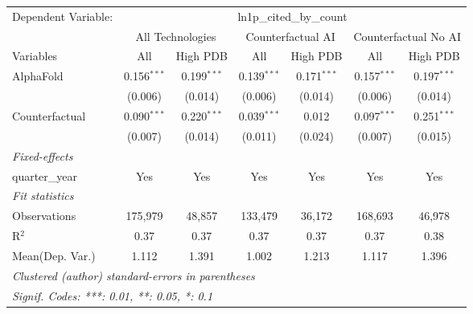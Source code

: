 \begingroup
\centering
\begin{tabular}{lcccccc}
   \tabularnewline \midrule \midrule
   Dependent Variable: & \multicolumn{6}{c}{ln1p\_cited\_by\_count}\\
 & \multicolumn{2}{c}{All Technologies} & \multicolumn{2}{c}{Counterfactual AI} & \multicolumn{2}{c}{Counterfactual No AI} \\
\cmidrule(lr){1-1}\cmidrule(lr){2-3} \cmidrule(lr){4-5} \cmidrule(lr){6-7}
Variables & \multicolumn{1}{c}{All} & \multicolumn{1}{c}{High PDB} & \multicolumn{1}{c}{All} & \multicolumn{1}{c}{High PDB} & \multicolumn{1}{c}{All} & \multicolumn{1}{c}{High PDB} \\
\cmidrule(lr){1-1}\cmidrule(lr){2-2} \cmidrule(lr){3-3} \cmidrule(lr){4-4} \cmidrule(lr){5-5} \cmidrule(lr){6-6} \cmidrule(lr){7-7}
   AlphaFold      & 0.156$^{***}$ & 0.199$^{***}$ & 0.139$^{***}$ & 0.171$^{***}$ & 0.157$^{***}$ & 0.197$^{***}$\\   
                  & (0.006)       & (0.014)       & (0.006)       & (0.014)       & (0.006)       & (0.014)\\   
   Counterfactual & 0.090$^{***}$ & 0.220$^{***}$ & 0.039$^{***}$ & 0.012         & 0.097$^{***}$ & 0.251$^{***}$\\   
                  & (0.007)       & (0.014)       & (0.011)       & (0.024)       & (0.007)       & (0.015)\\   
   \midrule
   \emph{Fixed-effects}\\
   quarter\_year  & Yes           & Yes           & Yes           & Yes           & Yes           & Yes\\  
   \midrule
   \emph{Fit statistics}\\
   Observations   & 175,979       & 48,857        & 133,479       & 36,172        & 168,693       & 46,978\\  
   R$^2$          & 0.37          & 0.37          & 0.37          & 0.37          & 0.37          & 0.38\\  
Mean(Dep. Var.) & 1.112 & 1.391 & 1.002 & 1.213 & 1.117 & 1.396 \\
   \midrule \midrule
   \multicolumn{7}{l}{\emph{Clustered (author) standard-errors in parentheses}}\\
   \multicolumn{7}{l}{\emph{Signif. Codes: ***: 0.01, **: 0.05, *: 0.1}}\\
\end{tabular}
\par\endgroup
